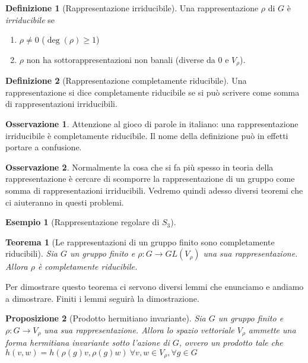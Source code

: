 \documentclass[11pt]{article}
\theoremstyle{plain}
\newtheorem{thm}{Teorema}[section]
\newtheorem{prop}[thm]{Proposizione}
\theoremstyle{definition}
\newtheorem{defn}{Definizione}[section]
\newtheorem{exmp}{Esempio}[section]
\newtheorem*{rem}{Osservazione}
\theoremstyle{remark}
\begin{document}
\begin{defn}[Rappresentazione irriducibile]
Una rappresentazione $\rho$ di $G$ è \textit{irriducibile} se
\begin{enumerate}
	\item $\rho \neq 0$ ($\deg(\rho) \geq 1$)
	\item $\rho$ non ha sottorappresentazioni non banali (diverse da 0 e $V_{\rho}$).
\end{enumerate}

\end{defn}


\begin{defn}[Rappresentazione completamente riducibile]
Una rappresentazione si dice completamente riducibile se si può scrivere come somma di rappresentazioni irriducibili.
\end{defn}


\begin{rem}
Attenzione al gioco di parole in italiano: una rappresentazione irriducibile è completamente riducibile. Il nome della definizione può in effetti portare a confusione.
\end{rem}


\begin{rem} Normalmente la cosa che si fa più spesso in teoria della rappresentazione è cercare di scomporre la rappresentazione di un gruppo come somma di rappresentazioni irriducibili. Vedremo quindi adesso diversi teoremi che ci aiuteranno in questi problemi.

\end{rem}



\begin{exmp}[Rappresentazione regolare di $S_3$]


\end{exmp}



\begin{thm}[Le rappresentazioni di un gruppo finito sono completamente riducibili]
  Sia $G$ un gruppo finito e $\rho: G \to GL(V_\rho)$ una sua rappresentazione. Allora $\rho$ è completamente riducibile.
  \label{thm:gruppo finito completamente riducibile}
\end{thm}
Per dimostrare questo teorema ci servono diversi lemmi che enunciamo e andiamo a dimostrare. Finiti i lemmi seguirà la dimostrazione.


\begin{prop}[Prodotto hermitiano invariante] Sia $G$ un gruppo finito e $\rho: G \to V_\rho$ una sua rappresentazione. Allora lo spazio vettoriale $V_\rho$ ammette una forma hermitiana invariante sotto l'azione di $G$, ovvero un prodotto tale che $h(v,w) = h(\rho(g) v, \rho(g) w) \ \forall v,w\in V_\rho, \forall g \in G$
\label{thm:esistenza hermitiana}
\end{prop}
\end{document}
